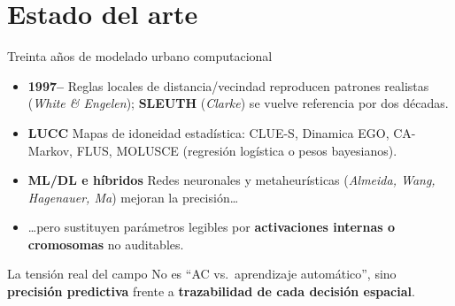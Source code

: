 \documentclass[aspectratio=169,11pt]{beamer}
\newcommand{\highlight}[1]{\textcolor{UNAMBlue}{\textbf{#1}}}
\begin{document}
\section{Estado del arte}

\begin{frame}{Treinta años de modelado urbano computacional}
  \small
  \begin{itemize}
    \item \highlight{1997--} Reglas locales de distancia/vecindad reproducen patrones realistas (\textit{White \& Engelen}); \textbf{SLEUTH} (\textit{Clarke}) se vuelve referencia por dos décadas.
    \item \highlight{LUCC} Mapas de idoneidad estadística: CLUE-S, Dinamica EGO, CA-Markov, FLUS, MOLUSCE (regresión logística o pesos bayesianos).
    \item \highlight{ML/DL e híbridos} Redes neuronales y metaheurísticas (\textit{Almeida, Wang, Hagenauer, Ma}) mejoran la precisión\ldots
    \item \ldots pero sustituyen parámetros legibles por \highlight{activaciones internas o cromosomas} no auditables.
  \end{itemize}
  \vspace{0.2cm}
  \begin{block}{La tensión real del campo}
    \centering No es ``AC vs.\ aprendizaje automático'', sino \highlight{precisión predictiva} frente a \highlight{trazabilidad de cada decisión espacial}.
  \end{block}
\end{frame}
\end{document}
